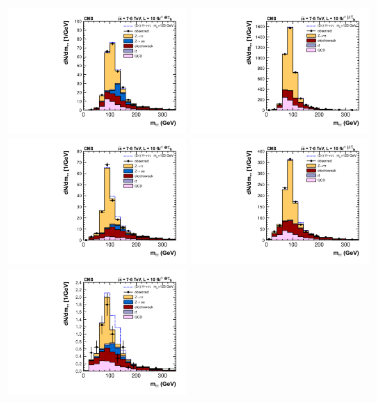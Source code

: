 \documentclass[12pt,twoside,a4paper,cmspaper,final,collab]{cms-tdr}
\begin{document}
\begin{figure}[htbp]
\begin{center}
\includegraphics[width=0.42\textwidth]{figures/htt/eleTau_0jet_rescaled_7and8TeV.pdf}
\includegraphics[width=0.42\textwidth]{figures/htt/muTau_0jet_rescaled_7and8TeV.pdf} \\
\includegraphics[width=0.42\textwidth]{figures/htt/eleTau_boost_rescaled_7and8TeV.pdf}
\includegraphics[width=0.42\textwidth]{figures/htt/muTau_boost_rescaled_7and8TeV.pdf} \\
\includegraphics[width=0.42\textwidth]{figures/htt/eleTau_vbf_rescaled_7and8TeV.pdf}

\end{center}
\end{figure}
\end{document}
